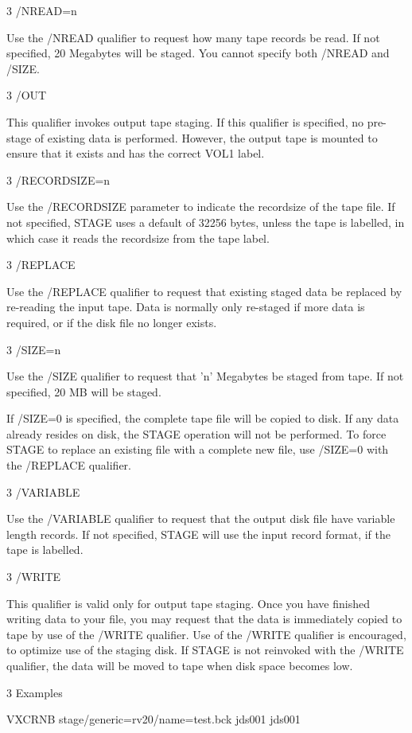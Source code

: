 \begin{XMP}
3 /NREAD=n

Use the /NREAD qualifier to request how many tape records be read.
If not specified, 20 Megabytes will be staged. You cannot specify
both /NREAD and /SIZE.

3 /OUT

This qualifier invokes output tape staging.
If this qualifier is specified, no pre-stage of existing data
is performed. However, the output tape is mounted to ensure that
it exists and has the correct VOL1 label.


3 /RECORDSIZE=n

Use the /RECORDSIZE parameter to indicate the recordsize of the tape file.
If not specified, STAGE uses a default of 32256 bytes, unless the tape is
labelled, in which case it reads the recordsize from the tape label.

3 /REPLACE

Use the /REPLACE qualifier to request that existing staged data be replaced
by re-reading the input tape. Data is normally only re-staged if more data
is required, or if the disk file no longer exists.

3 /SIZE=n

Use the /SIZE qualifier to request that 'n' Megabytes be staged from tape.
If not specified, 20 MB will be staged.

If /SIZE=0 is specified, the complete tape file will be copied to disk.
If any data already resides on disk, the STAGE operation will not be
performed. To force STAGE to replace an existing file with a complete
new file, use /SIZE=0 with the /REPLACE qualifier.

3 /VARIABLE

Use the /VARIABLE qualifier to request that the output disk file have
variable length records. If not specified, STAGE will use the input record
format, if the tape is labelled.

3 /WRITE

This qualifier is valid only for output tape staging.
Once you have finished writing data to your file, you may request that
the data is immediately copied to tape by use of the /WRITE qualifier.
Use of the /WRITE qualifier is encouraged, to optimize use of the
staging disk. If STAGE is not reinvoked with the /WRITE qualifier,
the data will be moved to tape when disk space becomes low.

3 Examples

VXCRNB       stage/generic=rv20/name=test.bck jds001 jds001


\end{XMP}
